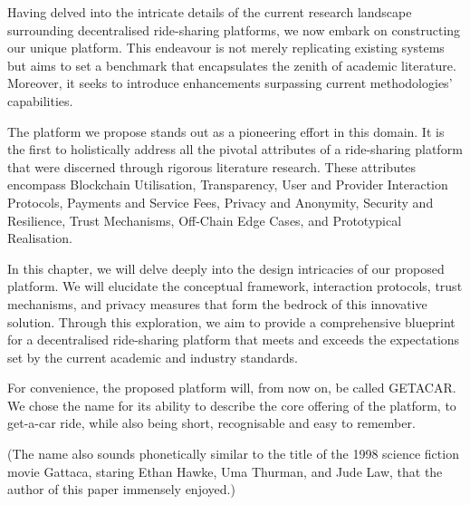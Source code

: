 Having delved into the intricate details of the current research landscape surrounding decentralised ride-sharing platforms, we now embark on constructing our unique platform. This endeavour is not merely replicating existing systems but aims to set a benchmark that encapsulates the zenith of academic literature. Moreover, it seeks to introduce enhancements surpassing current methodologies' capabilities.


The platform we propose stands out as a pioneering effort in this domain. It is the first to holistically address all the pivotal attributes of a ride-sharing platform that were discerned through rigorous literature research. These attributes encompass Blockchain Utilisation, Transparency, User and Provider Interaction Protocols, Payments and Service Fees, Privacy and Anonymity, Security and Resilience, Trust Mechanisms, Off-Chain Edge Cases, and Prototypical Realisation.

In this chapter, we will delve deeply into the design intricacies of our proposed platform. We will elucidate the conceptual framework, interaction protocols, trust mechanisms, and privacy measures that form the bedrock of this innovative solution. Through this exploration, we aim to provide a comprehensive blueprint for a decentralised ride-sharing platform that meets and exceeds the expectations set by the current academic and industry standards.

For convenience, the proposed platform will, from now on, be called GETACAR. We chose the name for its ability to describe the core offering of the platform, to get-a-car ride, while also being short, recognisable and easy to remember.

(The name also sounds phonetically similar to the title of the 1998 science fiction movie Gattaca, staring Ethan Hawke, Uma Thurman, and Jude Law, that the author of this paper immensely enjoyed.)